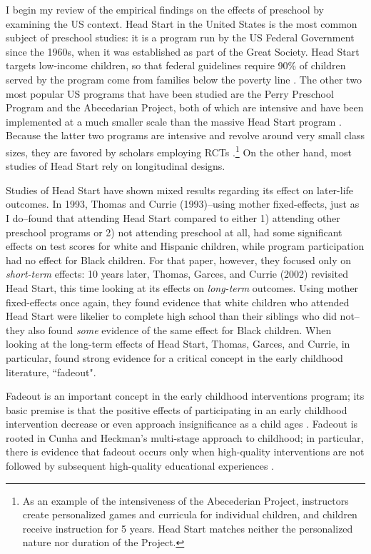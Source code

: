 I begin my review of the empirical findings on the effects of preschool by examining the US context. Head Start in the United States is the most common subject of preschool studies: it is a program run by the US Federal Government since the 1960s, when it was established as part of the Great Society. Head Start targets low-income children, so that federal guidelines require 90\% of children served by the program come from families below the poverty line \citep{Currie1993}. The other two most popular US programs that have been studied are the Perry Preschool Program and the Abecedarian Project, both of which are intensive and have been implemented at a much smaller scale than the massive Head Start program \citep{Heckman2010,Campbell2002}.  Because the latter two programs are intensive and revolve around very small class sizes, they are favored by scholars employing RCTs \citep{Muennig2011}.\footnote{As an example of the intensiveness of the Abecederian Project, instructors create personalized games and curricula for individual children, and children receive instruction for 5 years. Head Start matches neither the personalized nature nor duration of the Project.} On the other hand, most studies of Head Start rely on longitudinal designs.

Studies of Head Start have shown mixed results regarding its effect on later-life outcomes. In 1993, Thomas and Currie (1993)--using mother fixed-effects, just as I do--found that attending Head Start compared to either 1) attending other preschool programs or 2) not attending preschool at all, had some significant effects on test scores for white and Hispanic children, while program participation had no effect for Black children. For that paper, however, they focused only on \textit{short-term} effects: 10 years later, Thomas, Garces, and Currie (2002) revisited Head Start, this time looking at its effects on \textit{long-term} outcomes. Using mother fixed-effects once again, they found evidence that white children who attended Head Start were likelier to complete high school than their siblings who did not--they also found \textit{some} evidence of the same effect for Black children. When looking at the long-term effects of Head Start, Thomas, Garces, and Currie, in particular, found strong evidence for a critical concept in the early childhood literature, ``fadeout". 

Fadeout is an important concept in the early childhood interventions program; its basic premise is that the positive effects of participating in an early childhood intervention decrease or even approach insignificance as a child ages \citep{Abenavoli2019}. Fadeout is rooted in Cunha and Heckman's multi-stage approach to childhood; in particular, there is evidence that fadeout occurs only when high-quality interventions are not followed by subsequent high-quality educational experiences \citep{Bailey2017,Lee1995,Jenkins2018}. 

